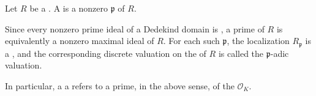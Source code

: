 \begin{definition} \label{definition:prime_of_a_dedekind_domain}
    Let $R$ be a . A  is a nonzero  $\mathfrak{p}$ of $R$.

    Since every nonzero prime ideal of a Dedekind domain is , a prime of $R$ is equivalently a nonzero maximal ideal of $R$. For each such $\mathfrak{p}$, the localization $R_{\mathfrak{p}}$ is a , and the corresponding discrete valuation on the  of $R$ is called the $\mathfrak{p}$-adic valuation.

    In particular, a  a refers to a prime, in the above sense, of the  $\mathcal{O}_K$. 
\end{definition}
